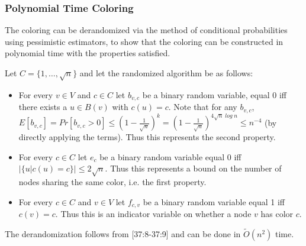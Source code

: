 \subsubsection{Polynomial Time Coloring}
The coloring can be derandomized via the method of conditional probabilities using pessimistic estimators, to show that the coloring can be constructed in polynomial time with the properties satisfied.

Let $C = \{ 1,\dots,\sqrt{n}\}$ and let the randomized algorithm be as follows:
\begin{itemize}
    \item For every $v \in V$ and $c \in C$ let $b_{v,c}$ be a binary random variable, equal 0 iff there exists a $u \in B(v)$ with $c(u) = c$. Note that for any $b_{v,c}$, $E[b_{v,c}] = Pr[b_{v,c} > 0] \leq (1 - \frac{1}{\sqrt{n}})^k = (1 - \frac{1}{\sqrt{n}})^{4 \sqrt{n}\;log\;n} \leq n^{-4}$ (by directly applying the terms). Thus this represents the second property. 
    \item For every $c\in C$ let $e_c$ be a binary random variable equal 0 iff $|\{u| c(u) = c\}| \leq 2\sqrt{n}$. Thus this represents a bound on the number of nodes sharing the same color, i.e. the first property.
    \item For every $c\in C$ and $v\in V$ let $f_{c,v}$ be a binary random variable equal 1 iff $c(v) = c$. Thus this is an indicator variable on whether a node $v$ has color $c$.
\end{itemize}

The derandomization follows from \cite{compactNameIndepRouting}[37:8-37:9] and can be done in $\tilde{O}(n^2)$ time.




